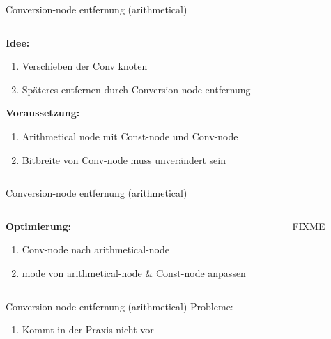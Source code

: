 \begin{frame}{Conversion-node entfernung (arithmetical)}
	\begin{columns}
		\begin{column}{0.5\textwidth}
			\textbf{Idee:}
			\begin{enumerate}
				\item Verschieben der Conv knoten
				\item Späteres entfernen durch Conversion-node entfernung
			\end{enumerate}
			\textbf{Voraussetzung:}
			\begin{enumerate}
				\item Arithmetical node mit Const-node und Conv-node
				\item Bitbreite von Conv-node muss unverändert sein
			\end{enumerate}
		\end{column}
		\begin{column}{0.5\textwidth}  %
			
		\end{column}
	\end{columns}
\end{frame}

\begin{frame}{Conversion-node entfernung (arithmetical)}

	\begin{columns}
		\begin{column}{0.5\textwidth}
			\textbf{Optimierung:}
			\begin{enumerate}
				\item Conv-node nach arithmetical-node
				\item mode von arithmetical-node \& Const-node anpassen
			\end{enumerate}
		\end{column}
		\begin{column}{0.5\textwidth}  %
			FIXME
		\end{column}
	\end{columns}
\end{frame}
\begin{frame}{Conversion-node entfernung (arithmetical)}
Probleme:
\begin{enumerate}
	\item Kommt in der Praxis nicht vor
\end{enumerate}
\end{frame}

